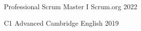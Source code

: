

\begin{cvhonors}

  \cvhonor
    {Professional Scrum Master I} %
    {Scrum.org} %
    {} %
    {2022} %

  \cvhonor
    {C1 Advanced}
    {Cambridge English}
    {} %
    {2019} %

\end{cvhonors}
